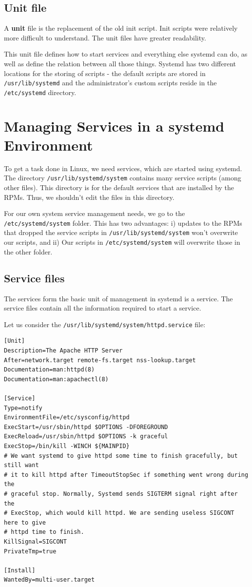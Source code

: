 \subsection{Unit file}
A \textbf{unit} file is the replacement of the old init script. Init scripts were relatively more difficult to understand. The unit files have greater readability. 

This unit file defines how to start services and everything else systemd can do, as well as define the relation between all those things. Systemd has two different locations for the storing of scripts - the default scripts are stored in \verb|/usr/lib/systemd| and the administrator's custom scripts reside in the \verb|/etc/systemd| directory. 

\section{Managing Services in a systemd Environment}
To get a task done in Linux, we need services, which are started using systemd. The directory \verb|/usr/lib/systemd/system| contains many service scripts (among other files). This directory is for the default services that are installed by the RPMs. Thus, we shouldn't edit the files in this directory. 

For our own system service management needs, we go to the \verb|/etc/systemd/system| folder. This has two advantages: i) updates to the RPMs that dropped the service scripts in \verb|/usr/lib/systemd/system| won't overwrite our scripts, and ii) Our scripts in \verb|/etc/systemd/system| will overwrite those in the other folder. 

\subsection{Service files}
The services form the basic unit of management in systemd is a service. The service files contain all the information required to start a service. 

Let us consider the \verb|/usr/lib/systemd/system/httpd.service| file:

\vspace{-15pt}
\begin{verbatim}
[Unit]
Description=The Apache HTTP Server
After=network.target remote-fs.target nss-lookup.target
Documentation=man:httpd(8)
Documentation=man:apachectl(8)

[Service]
Type=notify
EnvironmentFile=/etc/sysconfig/httpd
ExecStart=/usr/sbin/httpd $OPTIONS -DFOREGROUND
ExecReload=/usr/sbin/httpd $OPTIONS -k graceful
ExecStop=/bin/kill -WINCH ${MAINPID}
# We want systemd to give httpd some time to finish gracefully, but still want
# it to kill httpd after TimeoutStopSec if something went wrong during the
# graceful stop. Normally, Systemd sends SIGTERM signal right after the
# ExecStop, which would kill httpd. We are sending useless SIGCONT here to give
# httpd time to finish.
KillSignal=SIGCONT
PrivateTmp=true

[Install]
WantedBy=multi-user.target
\end{verbatim}
\vspace{-10pt}

